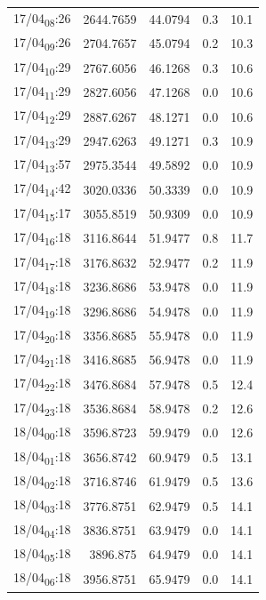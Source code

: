 \documentclass[11pt]{article}
\begin{document}
\begin{center}
\begin{tabular}{lrrrr}
17/04\textsubscript{08}:26 & 2644.7659 & 44.0794 & 0.3 & 10.1\\[0pt]
17/04\textsubscript{09}:26 & 2704.7657 & 45.0794 & 0.2 & 10.3\\[0pt]
17/04\textsubscript{10}:29 & 2767.6056 & 46.1268 & 0.3 & 10.6\\[0pt]
17/04\textsubscript{11}:29 & 2827.6056 & 47.1268 & 0.0 & 10.6\\[0pt]
17/04\textsubscript{12}:29 & 2887.6267 & 48.1271 & 0.0 & 10.6\\[0pt]
17/04\textsubscript{13}:29 & 2947.6263 & 49.1271 & 0.3 & 10.9\\[0pt]
17/04\textsubscript{13}:57 & 2975.3544 & 49.5892 & 0.0 & 10.9\\[0pt]
17/04\textsubscript{14}:42 & 3020.0336 & 50.3339 & 0.0 & 10.9\\[0pt]
17/04\textsubscript{15}:17 & 3055.8519 & 50.9309 & 0.0 & 10.9\\[0pt]
17/04\textsubscript{16}:18 & 3116.8644 & 51.9477 & 0.8 & 11.7\\[0pt]
17/04\textsubscript{17}:18 & 3176.8632 & 52.9477 & 0.2 & 11.9\\[0pt]
17/04\textsubscript{18}:18 & 3236.8686 & 53.9478 & 0.0 & 11.9\\[0pt]
17/04\textsubscript{19}:18 & 3296.8686 & 54.9478 & 0.0 & 11.9\\[0pt]
17/04\textsubscript{20}:18 & 3356.8685 & 55.9478 & 0.0 & 11.9\\[0pt]
17/04\textsubscript{21}:18 & 3416.8685 & 56.9478 & 0.0 & 11.9\\[0pt]
17/04\textsubscript{22}:18 & 3476.8684 & 57.9478 & 0.5 & 12.4\\[0pt]
17/04\textsubscript{23}:18 & 3536.8684 & 58.9478 & 0.2 & 12.6\\[0pt]
18/04\textsubscript{00}:18 & 3596.8723 & 59.9479 & 0.0 & 12.6\\[0pt]
18/04\textsubscript{01}:18 & 3656.8742 & 60.9479 & 0.5 & 13.1\\[0pt]
18/04\textsubscript{02}:18 & 3716.8746 & 61.9479 & 0.5 & 13.6\\[0pt]
18/04\textsubscript{03}:18 & 3776.8751 & 62.9479 & 0.5 & 14.1\\[0pt]
18/04\textsubscript{04}:18 & 3836.8751 & 63.9479 & 0.0 & 14.1\\[0pt]
18/04\textsubscript{05}:18 & 3896.875 & 64.9479 & 0.0 & 14.1\\[0pt]
18/04\textsubscript{06}:18 & 3956.8751 & 65.9479 & 0.0 & 14.1\\[0pt]

\end{tabular}
\end{center}
\end{document}
